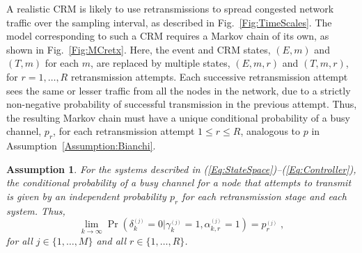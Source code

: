 \documentclass[journal]{IEEEtran}
\newtheorem{assumption}{Assumption}[section]
\begin{document}
A realistic CRM is likely to use retransmissions to spread congested network traffic over the sampling interval, as described in Fig.~\ref{Fig:TimeScales}. The model corresponding to such a CRM requires a Markov chain of its own, as shown in Fig.~\ref{Fig:MCretx}. Here, the event and CRM states, $(E,m)$ and $(T,m)$ for each $m$, are replaced by multiple states, $(E,m,r)$ and $(T,m,r)$, for $r=1,\dots,R$ retransmission attempts. Each successive retransmission attempt sees the same or lesser traffic from all the nodes in the network, due to a strictly non-negative probability of successful transmission in the previous attempt. Thus, the resulting Markov chain must have a unique conditional probability of a busy channel, $p_r$, for each retransmission attempt $1 \le r \le R$, analogous to $p$ in Assumption~\ref{Assumption:Bianchi}.
\begin{assumption} \label{Assumption:BianchiMulti}
For the systems described in (\ref{Eq:StateSpace})--(\ref{Eq:Controller}), the conditional probability of a busy channel for a node that attempts to transmit is given by an independent probability $p_r$ for each retransmission stage and each system. Thus,
\begin{equation} \label{Eq:BianchiMulti}
\lim_{k \to \infty} \Pr(\delta^{_{(j)}}_k=0|\gamma^{_{(j)}}_k=1,\alpha^{_{(j)}}_{k,r}=1) = p^{_{(j)}}_r \; ,
\end{equation}
for all $j \in \{1,\dots,M\}$ and all $r \in \{1,\dots,R\}$.
\end{assumption}
\end{document}
